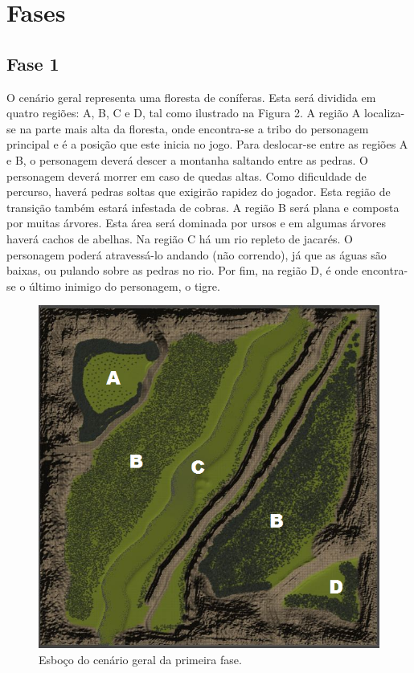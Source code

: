 ﻿\section{Fases}
\subsection{Fase 1}
O cenário geral representa uma floresta de coníferas. Esta será dividida em quatro 
regiões: A, B, C e D, tal como ilustrado na Figura 2. A região A localiza-se na parte 
mais alta da floresta, onde encontra-se a tribo do personagem principal e é a posição 
que este inicia no jogo. Para deslocar-se entre as regiões A e B, o personagem deverá 
descer a montanha saltando entre as pedras. O personagem deverá morrer em caso de 
quedas altas. Como dificuldade de percurso, haverá pedras soltas que exigirão rapidez 
do jogador. Esta região de transição também estará infestada de cobras. A região B 
será plana e composta por muitas árvores. Esta área será dominada por ursos e em 
algumas árvores haverá cachos de abelhas. Na região C há um rio repleto de jacarés. 
O personagem poderá atravessá-lo andando (não correndo), já que as águas são baixas, 
ou pulando sobre as pedras no rio. Por fim, na região D, é onde encontra-se o último 
inimigo do personagem, o tigre.

\begin{figure}[!ht]
 \centering
 \includegraphics[scale=0.6]{cenario01.png}
 \caption{Esboço do cenário geral da primeira fase.}
 \label{img:reason}
\end{figure}